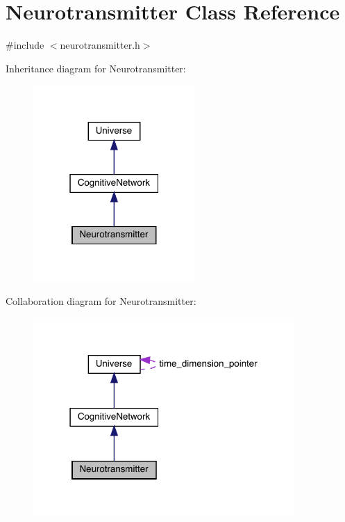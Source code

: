 \hypertarget{class_neurotransmitter}{}\section{Neurotransmitter Class Reference}
\label{class_neurotransmitter}


{\ttfamily \#include $<$neurotransmitter.\+h$>$}



Inheritance diagram for Neurotransmitter\+:\nopagebreak
\begin{figure}[H]
\begin{center}
\leavevmode
\includegraphics[width=175pt]{class_neurotransmitter__inherit__graph}
\end{center}
\end{figure}


Collaboration diagram for Neurotransmitter\+:\nopagebreak
\begin{figure}[H]
\begin{center}
\leavevmode
\includegraphics[width=283pt]{class_neurotransmitter__coll__graph}
\end{center}
\end{figure}
